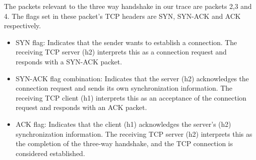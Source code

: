 The packets relevant to the three way handshake in our trace are packets 2,3 and 4. The flags set in these packet's TCP headers are SYN, SYN-ACK and ACK respectively.

\begin{itemize}
    \item SYN flag: Indicates that the sender wants to establish a connection. The receiving TCP server (h2) interprets this as a connection request and responds with a SYN-ACK packet.
    \item SYN-ACK flag combination: Indicates that the server (h2) acknowledges the connection request and sends its own synchronization information. The receiving TCP client (h1) interprets this as an acceptance of the connection request and responds with an ACK packet.
    \item ACK flag: Indicates that the client (h1) acknowledges the server's (h2) synchronization information. The receiving TCP server (h2) interprets this as the completion of the three-way handshake, and the TCP connection is considered established.
\end{itemize}